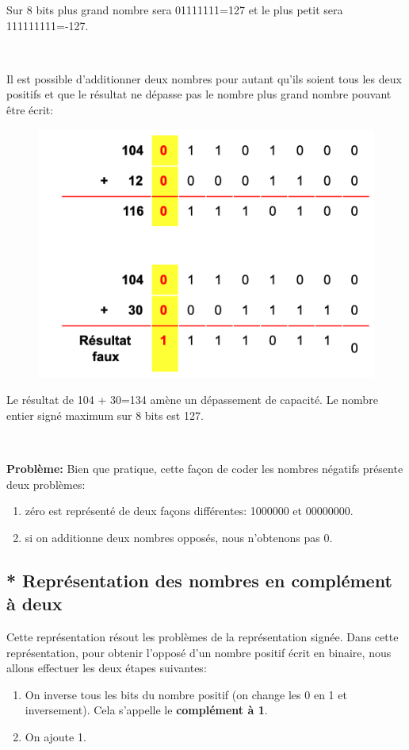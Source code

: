 \documentclass[11pt, a4paper]{book}
\begin{document}
Sur 8 bits plus grand nombre sera 01111111=127 et le plus petit sera 111111111=-127.

\ 

Il est possible d'additionner deux nombres pour autant qu'ils soient tous les deux positifs et que le résultat ne dépasse pas le nombre plus grand nombre pouvant être écrit:

\begin{figure}[h]
\begin{center}
\includegraphics[scale=.5]{images/operationsigne}
\end{center}
\end{figure}

Le résultat de 104 + 30=134 amène un dépassement de capacité. Le nombre entier signé maximum sur 8 bits est 127.


\ 

{\bf Problème:} Bien que pratique, cette façon de coder les nombres négatifs présente deux problèmes:
\begin{enumerate}
\item zéro est représenté de deux façons différentes: 1000000 et 00000000.
\item si on additionne deux nombres opposés, nous n'obtenons pas 0. 
\end{enumerate}

\subsection{* Représentation des nombres en complément à deux}

Cette représentation résout les problèmes de la représentation signée. Dans cette représentation, pour obtenir l'opposé d'un nombre positif écrit en binaire, nous allons effectuer les deux étapes suivantes:
\begin{enumerate}
 \item On inverse tous les bits du nombre positif (on change les 0 en 1 et inversement). Cela s'appelle le {\bf complément à 1}.
 \item On ajoute 1.
\end{enumerate}
\end{document}
